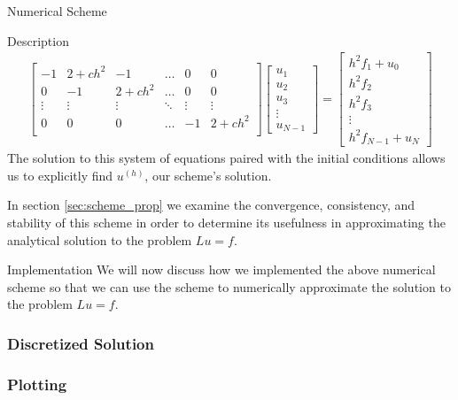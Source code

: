 \documentclass{article}
\begin{document}
\begin{section}{Numerical Scheme}
\begin{subsection}{Description}
\begin{align*}
\begin{bmatrix}
        -1 & 2 + ch^2 & -1 & \hdots & 0 & 0\\
        0 & -1 & 2 + ch^2 & \hdots & 0 & 0\\
        \vdots & \vdots & \vdots & \ddots & \vdots & \vdots \\
        0 & 0 & 0 & \hdots & -1 & 2+ch^2 \\
      \end{bmatrix}
      \begin{bmatrix}
        u_1 \\
        u_2 \\
        u_3 \\
        \vdots \\
        u_{N-1}
      \end{bmatrix}
      =
      \begin{bmatrix}
        h^2 f_1 + u_0 \\
        h^2 f_2 \\
        h^2 f_3 \\
        \vdots \\
        h^2 f_{N-1} + u_{N}
      \end{bmatrix}
    \end{align*}
    The solution to this system of equations paired with the initial conditions
    allows us to explicitly find $u^{(h)}$, our scheme's solution.

    In section \ref{sec:scheme_prop} we examine the convergence, consistency,
    and stability of this scheme in order to determine its usefulness in
    approximating the analytical solution to the problem $Lu = f$.
  \end{subsection}

  \begin{subsection}{Implementation}
    We will now discuss how we implemented the above numerical scheme so that
    we can use the scheme to numerically approximate the solution to the
    problem $Lu = f$.
    \subsubsection{Discretized Solution}

    \subsubsection{Plotting}

  \end{subsection}

\end{section}
\end{document}
